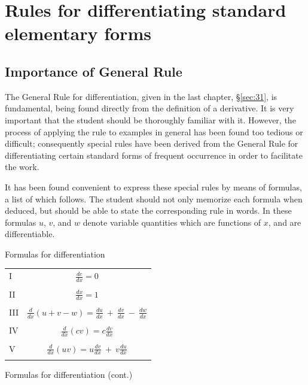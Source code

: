 
\chapter{Rules for differentiating standard elementary forms}

 
\section{Importance of General Rule}
\label{sec:33}

The General Rule for differentiation, given in the 
last chapter, %
\S \ref{sec:31},
is fundamental, being found directly from the definition 
of a derivative. %
It is very important that the 
student should be thoroughly familiar with it. However, the 
process of applying the rule to examples in general has been 
found too tedious or difficult; consequently special rules 
have been derived from the General Rule for differentiating 
certain standard forms of frequent occurrence in order to facilitate 
the work.

It has been found convenient to express these special rules by 
means of formulas, a list of which follows. The student 
should not only memorize each formula when deduced, but 
should be able to state the corresponding rule in words. In 
these formulas $u$, $v$, and $w$ denote variable quantities 
which are functions of $x$, and are differentiable.

\begin{center}
Formulas for differentiation
\end{center}

\begin{tabular}{lc}
I 	&  	$\frac{dc}{dx} 	= 0$\\
 & \\
II &	  	$\frac{dx}{dx} 	= 1$\\
 & \\
III &	  	$\frac{d}{dx}(u + v - w) 	= \frac{du}{dx}\ +\ \frac{dv}{dx}\ -\ \frac{dw}{dx}$\\
 & \\
IV 	 & 	$\frac{d}{dx} (cv) 	= c \frac{dv}{dx}$\\
 & \\
V 	 & 	$\frac{d}{dx} (uv) 	= u\frac{dv}{dx}\ +\ v\frac{du}{dx}$\\
 & \\
\end{tabular}

\newpage
\begin{center}
Formulas for differentiation (cont.)
\end{center}

